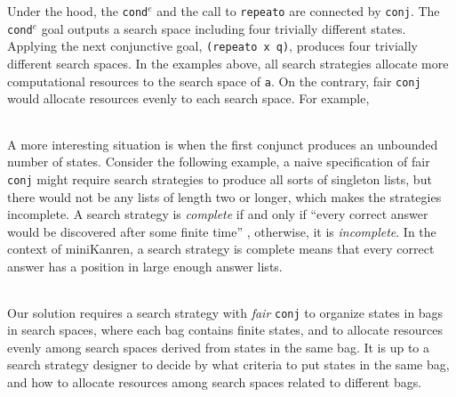 \documentclass[format=acmlarge, review=true, authordraft=true]{acmart}
\newcommand{\conde}{\texttt{cond$^e$}}
\newcommand{\conj}{\texttt{conj}}
\begin{document}
Under the hood, the \conde{} and the call to \texttt{repeato} are connected by 
\conj{}. The \conde{} goal outputs a search space including four trivially 
different states. 
Applying the next conjunctive goal, \texttt{(repeato x q)}, produces four 
trivially different search spaces.
In the examples above, all search strategies allocate more computational 
resources to the search space of \texttt{a}. On the contrary, fair \conj{} 
would allocate resources evenly to each search space. For example,

\begin{center}
	\begin{tabular}{c}
		
	\end{tabular}
\end{center}

A more interesting situation is when the first conjunct produces an unbounded
number of states. Consider the following example, a naive specification of 
fair \conj{} 
might require search strategies to produce all sorts of singleton lists, but 
there
would not be any lists of length two or longer, which makes the strategies 
incomplete. 
A search strategy is \emph{complete} if and only if ``every correct answer 
would be discovered after some finite time'' \cite{seres1999algebra}, 
otherwise, it is \emph{incomplete}. In the 
context of miniKanren, a search strategy is complete means that every correct 
answer has a position in large enough answer lists.


\begin{center}
	\begin{tabular}{c}
		
	\end{tabular}
\end{center}

Our solution requires a search strategy with \emph{fair} \conj{} to organize
states in bags in search spaces, where each bag contains finite states, and 
to allocate resources evenly among search spaces derived from states in the 
same bag. It is up to a search strategy designer to decide by what criteria to 
put states in the same bag, and how to allocate resources among search spaces 
related to different bags.
\end{document}
